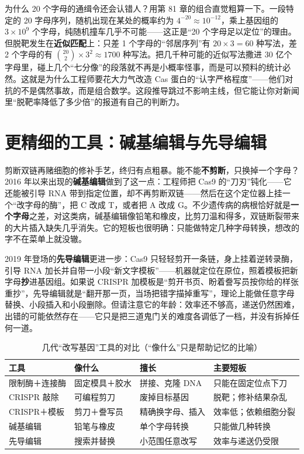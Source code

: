 \begin{tiaozhan}
为什么 20 个字母的通缉令还会认错人？用第 81 章的组合直觉粗算一下。一段特定的 20 字母序列，随机出现在某处的概率约为 $4^{-20}\approx 10^{-12}$，乘上基因组的 $3\times 10^{9}$ 个字母，纯随机撞车几乎不可能——这正是“20 个字母足以定位”的理由。但脱靶发生在\textbf{近似匹配}上：只差 1 个字母的“邻居序列”有 $20\times 3=60$ 种写法，差 2 个字母的有 $\binom{20}{2}\times 3^2\approx 1700$ 种写法。把几千种可能的近似写法撒进 30 亿个字母里，碰上几个“七分像”的段落就不再是小概率怪事，而是可以预料的统计必然。这就是为什么工程师要花大力气改造 Cas 蛋白的“认字严格程度”——他们对抗的不是偶然事故，而是组合数学。这段推导跳过不影响主线，但它能让你对新闻里“脱靶率降低了多少倍”的报道有自己的判断力。
\end{tiaozhan}

\section{更精细的工具：碱基编辑与先导编辑}

剪断双链再赌细胞的修补手艺，终归有点粗暴。能不能\textbf{不剪断}，只换掉一个字母？2016 年以来出现的\textbf{碱基编辑}做到了这一点：工程师把 Cas9 的“刀刃”钝化——它还能被引导 RNA 带到指定位置，却不再剪断双链——然后在这个定位器上挂一个“改字母的酶”，把 C 改成 T，或者把 A 改成 G。不少遗传病的病根恰好就是\textbf{一个字母}之差，对这类病，碱基编辑像铅笔和橡皮，比剪刀温和得多，双链断裂带来的大片插入缺失几乎消失。它的短板也很明确：只能做特定几种字母转换，想改的字不在菜单上就没辙。

2019 年登场的\textbf{先导编辑}更进一步：Cas9 只轻轻剪开一条链，身上挂着逆转录酶，引导 RNA 加长并自带一小段“新文字模板”——机器就定位在原位，照着模板把新字母\textbf{抄}进基因组。如果说 CRISPR 加模板是“剪开书页、盼着誊写员按你给的样张重抄”，先导编辑就是“翻开那一页，当场把错字描掉重写”，理论上能做任意字母替换、小段插入和小段删除。但请注意它的年龄：效率还不够高，递送仍然困难，出错的可能依然存在——它只是把三道鬼门关的难度各调低了一档，并没有拆掉任何一道。

\begin{table}[htbp]
\centering
\caption{几代“改写基因”工具的对比（“像什么”只是帮助记忆的比喻）}
\begin{tabular}{llll}
\toprule
工具 & 像什么 & 擅长 & 主要短板 \\
\midrule
限制酶＋连接酶 & 固定模具＋胶水 & 拼接、克隆 DNA & 只能在固定位点下刀 \\
CRISPR 敲除 & 可编程剪刀 & 废掉目标基因 & 脱靶；修补结果杂乱 \\
CRISPR＋模板 & 剪刀＋誊写员 & 精确换字母、插入 & 效率低；依赖细胞分裂 \\
碱基编辑 & 铅笔与橡皮 & 单个字母转换 & 只能做几种转换 \\
先导编辑 & 搜索并替换 & 小范围任意改写 & 效率与递送仍受限 \\
\bottomrule
\end{tabular}
\end{table}

